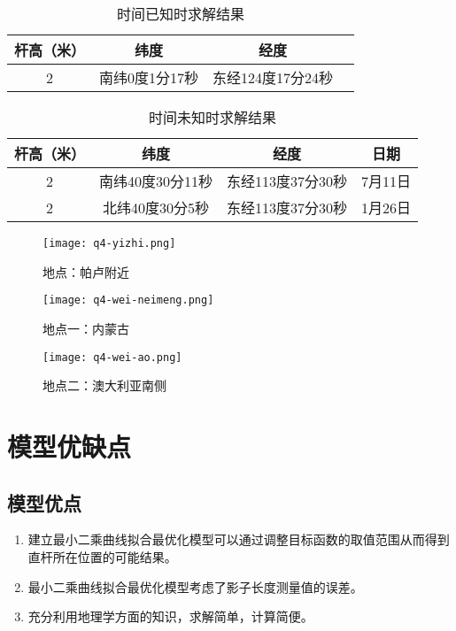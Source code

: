 \documentclass[withoutpreface,bwprint]{cumcmthesis} %
\begin{document}
\begin{table}[!htbp]
\centering
\caption{时间已知时求解结果}
\label{时间已知时求解结果}
\begin{tabular}{cccc}
\toprule
杆高（米）&纬度&经度\\ 
\midrule
2&南纬0度1分17秒&东经124度17分24秒\\
\bottomrule 
\end{tabular}
\end{table}

\begin{table}[!htbp]
\centering
\caption{时间未知时求解结果}
\label{时间未知时求解结果}
\begin{tabular}{cccc}
\toprule
杆高（米）&纬度&经度 & 日期\\ 
\midrule
2&南纬40度30分11秒&东经113度37分30秒&7月11日\\
2&北纬40度30分5秒&东经113度37分30秒&1月26日\\
\bottomrule 
\end{tabular}
\end{table}


\begin{figure}[h]
\small
\centering
\texttt{[image: q4-yizhi.png]}
\caption{地点：帕卢附近} \label{fig:4-yizhi}
\end{figure}


\begin{figure}[!htbp]  
\begin{minipage}[t]{0.5\textwidth}
\centering  
\texttt{[image: q4-wei-neimeng.png]}
\caption{地点一：内蒙古} \label{fig:q4-wei-neimeng}\end{minipage}
\hspace{1ex}
\begin{minipage}[t]{0.5\textwidth}  
\centering  
\texttt{[image: q4-wei-ao.png]}
\caption{地点二：澳大利亚南侧} \label{fig:q4-wei-ao}
\end{minipage}  
\end{figure} 




\newpage
\section{模型优缺点}
\subsection{模型优点}
\begin{enumerate}
	\item 建立最小二乘曲线拟合最优化模型可以通过调整目标函数的取值范围从而得到直杆所在位置的可能结果。
	\item 最小二乘曲线拟合最优化模型考虑了影子长度测量值的误差。
	\item 充分利用地理学方面的知识，求解简单，计算简便。
\end{enumerate}
\end{document}
